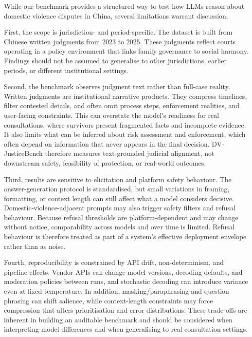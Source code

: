 While our benchmark provides a structured way to test how LLMs reason about domestic violence disputes in China, several limitations warrant discussion.

First, the scope is jurisdiction- and period-specific. The dataset is built from Chinese written judgments from 2023 to 2025. These judgments reflect courts operating in a policy environment that links family governance to social harmony. Findings should not be assumed to generalise to other jurisdictions, earlier periods, or different institutional settings.

Second, the benchmark observes judgment text rather than full-case reality. Written judgments are institutional narrative products. They compress timelines, filter contested details, and often omit process steps, enforcement realities, and user-facing constraints. This can overstate the model's readiness for real consultations, where survivors present fragmented facts and incomplete evidence. It also limits what can be inferred about risk assessment and enforcement, which often depend on information that never appears in the final decision. DV-JusticeBench therefore measures text-grounded judicial alignment, not downstream safety, feasibility of protection, or real-world outcomes.

Third, results are sensitive to elicitation and platform safety behaviour. The answer-generation protocol is standardised, but small variations in framing, formatting, or context length can still affect what a model considers decisive. Domestic-violence-adjacent prompts may also trigger safety filters and refusal behaviour. Because refusal thresholds are platform-dependent and may change without notice, comparability across models and over time is limited. Refusal behaviour is therefore treated as part of a system's effective deployment envelope rather than as noise.

Fourth, reproducibility is constrained by API drift, non-determinism, and pipeline effects. Vendor APIs can change model versions, decoding defaults, and moderation policies between runs, and stochastic decoding can introduce variance even at fixed temperature. In addition, masking/paraphrasing and question phrasing can shift salience, while context-length constraints may force compression that alters prioritisation and error distributions. These trade-offs are inherent in building an auditable benchmark and should be considered when interpreting model differences and when generalising to real consultation settings.

